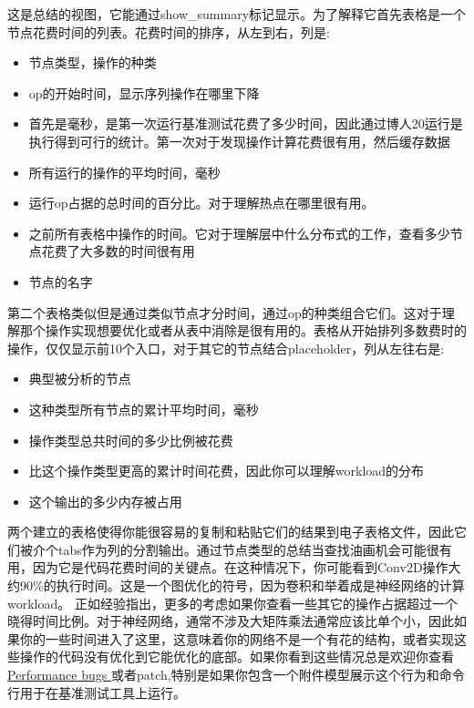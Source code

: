 这是总结的视图，它能通过show\_summary标记显示。为了解释它首先表格是一个节点花费时间的列表。花费时间的排序，从左到右，列是:
\begin{itemize}
\item 节点类型，操作的种类
\item op的开始时间，显示序列操作在哪里下降
\item 首先是毫秒，是第一次运行基准测试花费了多少时间，因此通过博人20运行是执行得到可行的统计。第一次对于发现操作计算花费很有用，然后缓存数据
\item 所有运行的操作的平均时间，毫秒
\item 运行op占据的总时间的百分比。对于理解热点在哪里很有用。
\item 之前所有表格中操作的时间。它对于理解层中什么分布式的工作，查看多少节点花费了大多数的时间很有用
\item 节点的名字
\end{itemize}
第二个表格类似但是通过类似节点才分时间，通过op的种类组合它们。这对于理解那个操作实现想要优化或者从表中消除是很有用的。表格从开始排列多数费时的操作，仅仅显示前10个入口，对于其它的节点结合placeholder，列从左往右是:
\begin{itemize}
\item 典型被分析的节点
\item 这种类型所有节点的累计平均时间，毫秒
\item 操作类型总共时间的多少比例被花费
\item 比这个操作类型更高的累计时间花费，因此你可以理解workload的分布
\item 这个输出的多少内存被占用
\end{itemize}
两个建立的表格使得你能很容易的复制和粘贴它们的结果到电子表格文件，因此它们被介个tabs作为列的分割输出。通过节点类型的总结当查找油画机会可能很有用，因为它是代码花费时间的关键点。在这种情况下，你可能看到Conv2D操作大约90\%的执行时间。这是一个图优化的符号，因为卷积和举着成是神经网络的计算workload。
正如经验指出，更多的考虑如果你查看一些其它的操作占据超过一个晓得时间比例。对于神经网络，通常不涉及大矩阵乘法通常应该比单个小，因此如果你的一些时间进入了这里，这意味着你的网络不是一个有花的结构，或者实现这些操作的代码没有优化到它能优化的底部。如果你看到这些情况总是欢迎你查看\href{https://github.com/tensorflow/tensorflow/issues}{Performance bugs }或者patch,特别是如果你包含一个附件模型展示这个行为和命令行用于在基准测试工具上运行。

